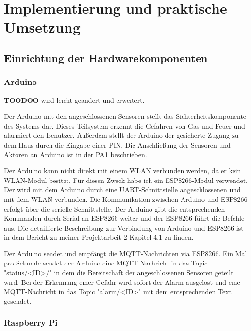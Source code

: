 \documentclass[12pt, letterpaper]{article}
\begin{document}
\section{Implementierung und praktische Umsetzung}
\subsection{Einrichtung der Hardwarekomponenten}
  \subsubsection{Arduino}
  \par \textbf{TOODOO} wird leicht geändert und erweitert.
  \par Der Arduino mit den angeschlossenen Sensoren stellt das Sichterheitskomponente des Systems dar. Dieses Teilsystem erkennt die Gefahren von Gas und Feuer und alarmiert den Benutzer. Außerdem stellt der Arduino der gesicherte Zugang zu dem Haus durch die Eingabe einer PIN. Die Anschließung der Sensoren und Aktoren an Arduino ist in der PA1 \cite{pa1} beschrieben. 
  \par Der Arduino kann nicht direkt mit einem WLAN verbunden werden, da er kein WLAN-Modul besitzt. Für diesen Zweck habe ich ein ESP8266-Modul verwendet. Der wird mit dem Arduino durch eine UART-Schnittstelle angeschlossenen und mit dem WLAN verbunden. Die Kommunikation zwischen Arduino und ESP8266 erfolgt über die serielle Schnittstelle. Der Arduino gibt die entsprechenden Kommanden durch Serial an ESP8266 weiter und der ESP8266 führt die Befehle aus. Die detaillierte Beschreibung zur Verbindung von Arduino und ESP8266 ist in dem Bericht zu meiner Projektarbeit 2 \cite{pa2} Kapitel 4.1 zu finden.
  \par Der Arduino sendet und empfängt die MQTT-Nachrichten via ESP8266. Ein Mal pro Sekunde sendet der Arduino eine MQTT-Nachricht in das Topic "status/<ID>/" in dem die Bereitschaft der angeschlossenen Sensoren geteilt wird. Bei der Erkennung einer Gefahr wird sofort der Alarm ausgelöst und eine MQTT-Nachricht in das Topic "alarm/<ID>" mit dem entsprechenden Text gesendet.
  \subsubsection{Raspberry Pi}
\end{document}
